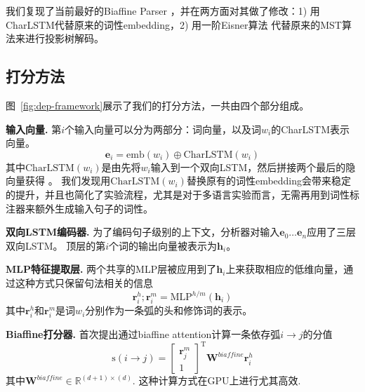 我们复现了当前最好的Biaffine Parser \citep{dozat-etal-2017-biaffine}，并在两方面对其做了修改：1) 用CharLSTM代替原来的词性embedding，2) 用一阶Eisner算法 \citep{eisner-2000-iwptbook}代替原来的MST算法来进行投影树解码。

\subsection{打分方法}
图~\ref{fig:dep-framework}展示了我们的打分方法，一共由四个部分组成。

\noindent\textbf{输入向量.}
第$i$个输入向量可以分为两部分：词向量，以及词$w_i$的CharLSTM表示向量。
\begin{equation}
	\label{eq:input}
	\mathbf{e}_i=\mathrm{emb}({w_i}) \oplus \mathrm{CharLSTM}(w_i)
\end{equation}
其中$\mathrm{CharLSTM}(w_i)$是由先将$w_i$输入到一个双向LSTM，然后拼接两个最后的隐向量获得 \citep{lample-etal-2016-neural}。
我们发现用$\mathrm{CharLSTM}(w_i)$替换原有的词性embedding会带来稳定的提升，并且也简化了实验流程，尤其是对于多语言实验而言，无需再用到词性标注器来额外生成输入句子的词性。

\noindent\textbf{双向LSTM编码器.}
为了编码句子级别的上下文，分析器对输入$\mathbf{e}_0 \dots \mathbf{e}_n$应用了三层双向LSTM。
顶层的第$i$个词的输出向量被表示为$\mathbf{h}_i$。

\noindent\textbf{MLP特征提取层.}
两个共享的MLP层被应用到了$\mathbf{h}_i$上来获取相应的低维向量，通过这种方式只保留句法相关的信息
\begin{equation}
	\label{mlp-arc}
	\mathbf{r}_i^{h}; \mathbf{r}_i^{m} =\mathrm{MLP}^{h/m} \left( \mathbf{h}_i \right)
\end{equation}
其中$\mathbf{r}_i^{h}$和$\mathbf{r}_i^{m}$是词$w_i$分别作为一条弧的头和修饰词的表示。

\noindent\textbf{Biaffine打分器.}
\citet{dozat-etal-2017-biaffine}首次提出通过biaffine attention计算一条依存弧$i \rightarrow j$的分值
\begin{equation} \label{eq:biaffine}
	\mathrm{s}(i\rightarrow j) =  \left[
		\begin{array}{c}
			\mathbf{r}_{j}^{m} \\
			1                  
		\end{array}
	\right]^\mathrm{T}
	\mathbf{W}^\textit{biaffine}  \mathbf{r}_{i}^{h}
\end{equation}
其中$\mathbf{W}^\textit{biaffine} \in \mathbb{R}^{(d+1) \times (d)}$.
这种计算方式在GPU上进行尤其高效.

